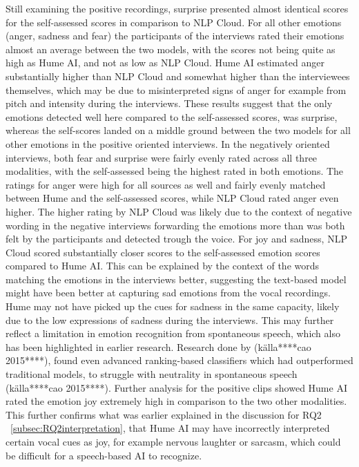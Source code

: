 Still examining the positive recordings, surprise presented almost identical scores for the self-assessed scores in comparison to NLP Cloud. For all other emotions (anger, sadness and fear) the participants of the interviews rated their emotions almost an average between the two models, with the scores not being quite as high as Hume AI, and not as low as NLP Cloud. Hume AI estimated anger substantially higher than NLP Cloud and somewhat higher than the interviewees themselves, which may be due to misinterpreted signs of anger for example from pitch and intensity during the interviews.
These results suggest that the only emotions detected well here compared to the self-assessed scores, was surprise, whereas the self-scores landed on a middle ground between the two models for all other emotions in the positive oriented interviews.
In the negatively oriented interviews, both fear and surprise were fairly evenly rated across all three modalities, with the self-assessed being the highest rated in both emotions.
The ratings for anger were high for all sources as well and fairly evenly matched between Hume and the self-assessed scores, while NLP Cloud rated anger even higher. The higher rating by NLP Cloud was likely due to the context of negative wording in the negative interviews forwarding the emotions more than was both felt by the participants and detected trough the voice.
For joy and sadness, NLP Cloud scored substantially closer scores to the self-assessed emotion scores compared to Hume AI. This can be explained by the context of the words matching the emotions in the interviews better, suggesting the text-based model might have been better at capturing sad emotions from the vocal recordings. Hume may not have picked up the cues for sadness in the same capacity, likely due to the low expressions of sadness during the interviews. This may further reflect a limitation in emotion recognition from spontaneous speech, which also has been highlighted in earlier research. Research done by (källa****cao 2015****), found even advanced ranking-based classifiers which had outperformed traditional models, to struggle with neutrality in spontaneous speech (källa****cao 2015****).
Further analysis for the positive clips showed Hume AI rated the emotion joy extremely high in comparison to the two other modalities. This further confirms what was earlier explained in the discussion for RQ2 ~\ref{subsec:RQ2interpretation}, that Hume AI may have incorrectly interpreted certain vocal cues as joy, for example nervous laughter or sarcasm, which could be difficult for a speech-based AI to recognize.


